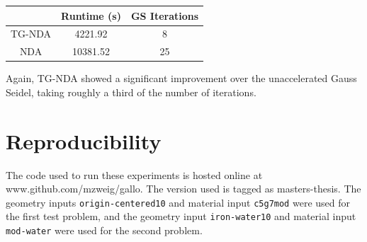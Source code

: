\begin{center}
    \begin{tabular}{|c|c|c|}
    \hline
    & Runtime (s) & GS Iterations \\
    \hline
    TG-NDA & 4221.92 & 8 \\
    NDA & 10381.52 & 25 \\
    \hline
    \end{tabular}
\end{center}

Again, TG-NDA showed a significant improvement over the unaccelerated Gauss Seidel, taking roughly a third of the number of iterations. 
\section{Reproducibility}
The code used to run these experiments is hosted online at \\ www.github.com/mzweig/gallo. The version used is tagged as masters-thesis. The geometry inputs \texttt{origin-centered10} and material input \texttt{c5g7mod} were used for the first test problem, and the geometry input \texttt{iron-water10} and material input \texttt{mod-water} were used for the second problem. 
